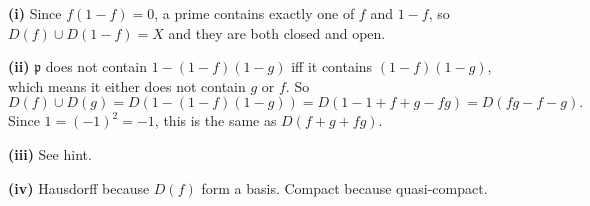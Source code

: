 \textbf{(i)} Since $f(1-f)=0$, a prime contains exactly one of $f$ and $1-f$, so $D(f)\cup D(1-f)=X$ and they are both closed and open.

\textbf{(ii)} $\mathfrak p$ does not contain $1-(1-f)(1-g)$ iff it contains $(1-f)(1-g)$, which means it either does not contain $g$ or $f$. So
\[
D(f)\cup D(g)=D(1-(1-f)(1-g))=D(1-1+f+g-fg)=D(fg-f-g).
\]
Since $1=(-1)^2=-1$, this is the same as $D(f+g+fg)$.

\textbf{(iii)} See hint.

\textbf{(iv)} Hausdorff because $D(f)$ form a basis. Compact because quasi-compact.

